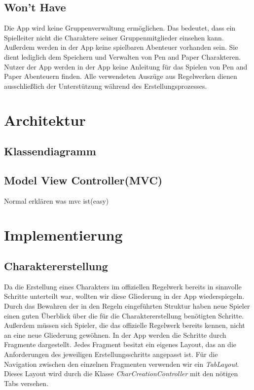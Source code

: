 \subsection{Won't Have}
Die App wird keine Gruppenverwaltung ermöglichen. Das bedeutet, dass ein Spielleiter nicht die Charaktere seiner Gruppenmitglieder einsehen kann. Außerdem werden in der App keine spielbaren Abenteuer vorhanden sein. Sie dient lediglich dem Speichern und Verwalten von Pen and Paper Charakteren. Nutzer der App werden in der App keine Anleitung für das Spielen von Pen and Paper Abenteuern finden. Alle verwendeten Auszüge aus Regelwerken dienen ausschließlich der Unterstützung während des Erstellungsprozesses. 

\newpage
\section{Architektur}
\subsection{Klassendiagramm}
\subsection{Model View Controller(MVC)}
Normal erklären was mvc ist(easy)

\newpage
\section{Implementierung}

\subsection{Charaktererstellung}
Da die Erstellung eines Charakters im offiziellen Regelwerk bereits in sinnvolle Schritte unterteilt war, wollten wir diese Gliederung in der App wiederspiegeln. Durch das Bewahren der in den Regeln eingeführten Struktur haben neue Spieler einen guten Überblick über die für die Charaktererstellung benötigten Schritte. Außerdem müssen sich Spieler, die das offizielle Regelwerk bereits kennen, nicht an eine neue Gliederung gewöhnen. In der App werden die Schritte durch Fragmente dargestellt. Jedes Fragment besitzt ein eigenes Layout, das an die Anforderungen des jeweiligen Erstellungsschritts angepasst ist. Für die Navigation zwischen den einzelnen Fragmenten verwenden wir ein \textit{TabLayout}. Dieses Layout wird durch die Klasse \textit{CharCreationController} mit den nötigen Tabs versehen.\\

